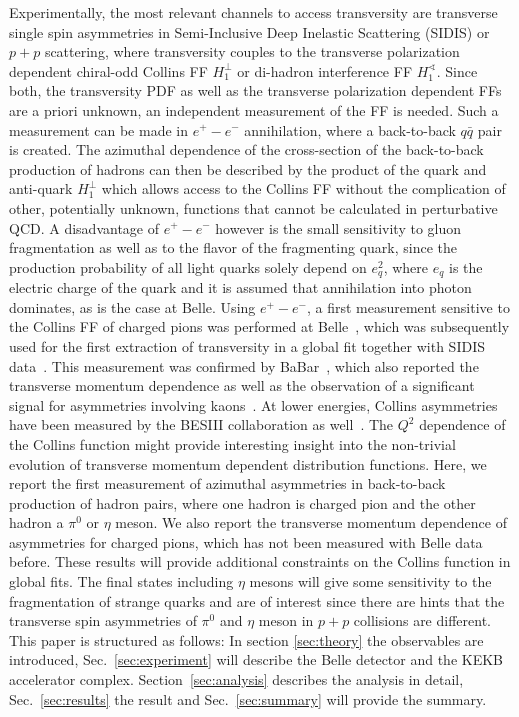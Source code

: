 \documentclass[aps,prX,preprint,groupedaddress,linenumbers]{revtex4-1}
\begin{document}
Experimentally, the most relevant channels to access transversity are transverse single spin asymmetries in Semi-Inclusive Deep Inelastic Scattering (SIDIS) or $p+p$ scattering, where transversity couples to the transverse polarization dependent chiral-odd Collins FF $H_1^\perp$ or di-hadron interference FF $H_1^\sphericalangle$. Since both, the transversity PDF as well as the transverse polarization dependent FFs are a priori unknown, an independent measurement of the FF is needed.
Such a measurement can be made in $e^+-e^-$ annihilation, where a back-to-back $q\bar{q}$ pair is created. The azimuthal dependence of the cross-section of the back-to-back production of hadrons can then be described by the product of the quark and anti-quark $H_1^\perp$ which allows access to the Collins FF without the complication of other, potentially unknown, functions that cannot be calculated in perturbative QCD. A disadvantage of $e^+-e^-$ however is the small sensitivity to gluon fragmentation as well as to the flavor of the fragmenting quark, since the production probability of all light quarks solely depend on $e_q^2$, where $e_q$ is the electric charge of the quark and it is assumed that annihilation into photon dominates, as is the case at Belle.
Using $e^+-e^-$, a first measurement sensitive to the Collins FF of charged pions was performed at Belle~\cite{Abe:2005zx,ChargedPionResult2}, which was subsequently used for the first extraction of transversity in a global fit together with SIDIS data~\cite{TransversityandCollinsfromSIDISandEE}. This measurement was confirmed by BaBar~\cite{BabarCharged}, which also reported the transverse momentum dependence as well as the observation of a significant signal for asymmetries involving kaons~\cite{BabarKaon}. At lower energies, Collins asymmetries have been measured by the BESIII collaboration as well~\cite{BESIII}. The $Q^2$ dependence of the Collins function might provide interesting insight into the non-trivial evolution of transverse momentum dependent distribution functions.
Here, we report the first measurement of azimuthal asymmetries in back-to-back production of hadron pairs, where one hadron is charged pion and the other hadron a $\pi^0$ or $\eta$ meson. We also report the transverse momentum dependence of asymmetries for charged pions, which has not been measured with Belle data before.
These results will provide additional constraints on the Collins function in global fits. The final states including $\eta$ mesons will give some sensitivity to the fragmentation of strange quarks and are of interest since there are hints that the transverse spin asymmetries of $\pi^0$ and $\eta$ meson in $p+p$ collisions are different.
This paper is structured as follows:
In section \ref{sec:theory} the observables are introduced, Sec.~\ref{sec:experiment} will describe the Belle detector and the KEKB accelerator complex. Section~\ref{sec:analysis} describes the analysis in detail, Sec.~\ref{sec:results} the result and  Sec.~\ref{sec:summary} will provide the summary.
\end{document}
